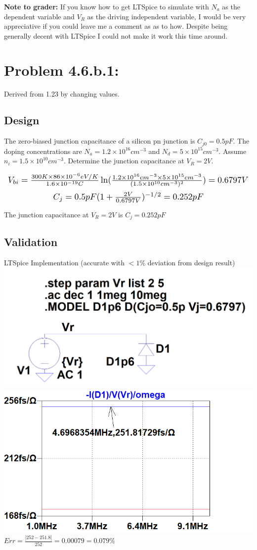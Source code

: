 \documentclass[12pt,letterpaper,titlepage]{article}
\begin{document}
\begin{raggedright}
\textbf{Note to grader:} If you know how to get LTSpice to simulate with $N_a$ as the dependent variable and $V_R$ as the driving independent variable, I would be very appreciative if you could leave me a comment as as to how. Despite being generally decent with LTSpice I could not make it work this time around.

\clearpage
\section{Problem 4.6.b.1: } Derived from 1.23 by changing values.
\subsection{Design}
The zero-biased junction capacitance of a silicon pn junction is $C_{j0} = 0.5 pF$. The doping concentrations are $N_a = 1.2 \times 10^{16} cm^{-3}$ and
$N_d = 5 \times 10^{15} cm^{-3}$. Assume $n_i = 1.5 \times 10^{10} cm^{-3}$. Determine the junction capacitance at $V_R = 2V$.

\begin{equation}\scalebox{1.25}{
$
V_{bi} = \frac{300K \times 86\times 10^{-6} eV/K}{1.6 \times 10^{-19} C}\ln(\frac{1.2 \times 10^{16} cm^{-3} \times 5 \times 10^{15} cm^{-3}}{(1.5 \times 10^{10} cm^{-3})^2}) = 0.6797V
$
}
\end{equation}
\begin{equation}\scalebox{1.25}{
$
C_j = 0.5pF (1 + \frac{2V}{0.6797V})^{-1/2} = 0.252pF
$
}
\end{equation}

The junction capacitance at $V_R = 2V$ is $C_j = 0.252pF$

\subsection{Validation}

\begin{center}
LTSpice Implementation (accurate with $< 1\%$ deviation from design result)
\includegraphics[width=.49\textwidth, height=\textheight, keepaspectratio=true]{ds2b}
\includegraphics[width=.49\textwidth, height=\textheight, keepaspectratio=true]{ds2c}
$Err = \frac{|252-251.8|}{252} = 0.00079 = 0.079\%$
\end{center}


\end{raggedright}
\end{document}
